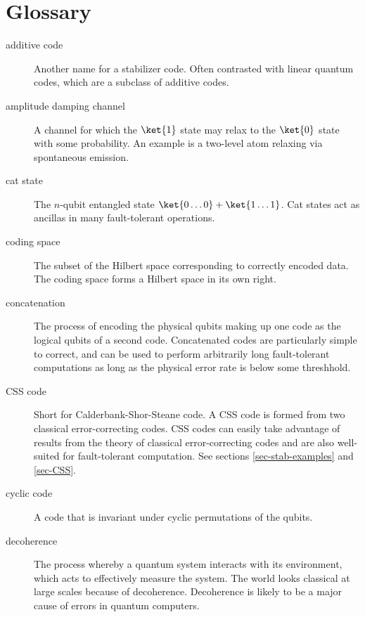 \chapter{Glossary}
\label{app-glossary}

\begin{description}

	\item[additive code] Another name for a stabilizer code.  Often contrasted
	with linear quantum codes, which are a subclass of additive codes.

	\item[amplitude damping channel] A channel for which the $\ket{1}$ state
	may relax to the $\ket{0}$ state with some probability.  An example is
	a two-level atom relaxing via spontaneous emission.

	\item[cat state] The $n$-qubit entangled state $\ket{0 \ldots 0} + \ket{1
	\ldots 1}$.  Cat states act as ancillas in many fault-tolerant operations.

	\item[coding space] The subset of the Hilbert space corresponding to correctly
	encoded data.  The coding space forms a Hilbert space in its own right.

	\item[concatenation] The process of encoding the physical qubits making
	up one code as the logical qubits of a second code.  Concatenated codes
	are particularly simple to correct, and can be used to perform arbitrarily
	long fault-tolerant computations as long as the physical error rate is
	below some threshhold.

	\item[CSS code] Short for Calderbank-Shor-Steane code.  A CSS code is formed
	from two classical error-correcting codes.  CSS codes can easily take
	advantage of results from the theory of classical error-correcting codes
	and are also well-suited for fault-tolerant computation.  See sections
	\ref{sec-stab-examples} and \ref{sec-CSS}.

	\item[cyclic code] A code that is invariant under cyclic permutations of
	the qubits.

	\item[decoherence] The process whereby a quantum system interacts with its
	environment, which acts to effectively measure the system.  The world looks
	classical at large scales because of decoherence.  Decoherence is likely to
	be a major cause of errors in quantum computers.


\end{description}

